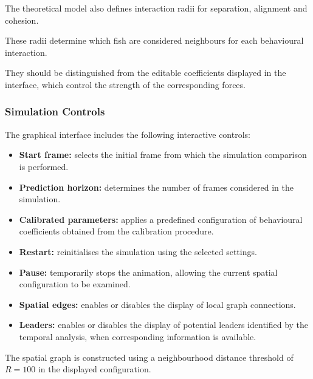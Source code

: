 \documentclass[10pt,a4paper]{article}
\begin{document}
The theoretical model also defines
interaction radii for separation,
alignment and cohesion.

These radii determine which fish
are considered neighbours for
each behavioural interaction.

They should be distinguished from
the editable coefficients displayed
in the interface, which control
the strength of the corresponding forces.

\subsubsection*{Simulation Controls}

The graphical interface includes
the following interactive controls:

\begin{itemize}

    \item \textbf{Start frame:}
    selects the initial frame
    from which the simulation
    comparison is performed.

    \item \textbf{Prediction horizon:}
    determines the number of frames
    considered in the simulation.

    \item \textbf{Calibrated parameters:}
    applies a predefined configuration
    of behavioural coefficients obtained
    from the calibration procedure.

    \item \textbf{Restart:}
    reinitialises the simulation
    using the selected settings.

    \item \textbf{Pause:}
    temporarily stops the animation,
    allowing the current spatial
    configuration to be examined.

    \item \textbf{Spatial edges:}
    enables or disables the
    display of local graph connections.

    \item \textbf{Leaders:}
    enables or disables the display
    of potential leaders identified
    by the temporal analysis,
    when corresponding information
    is available.

\end{itemize}

The spatial graph is constructed
using a neighbourhood distance
threshold of $R=100$ in the
displayed configuration.
\end{document}
